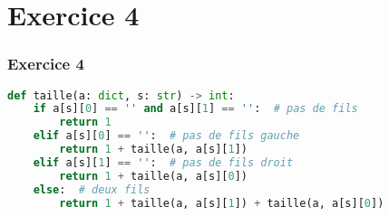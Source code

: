 \documentclass[svgnames,11pt]{beamer}
\begin{document}
\section{Exercice 4}
\begin{frame}[fragile]
    \frametitle{Exercice 4}

\begin{center}
\begin{lstlisting}[language=Python , basicstyle=\ttfamily\small, xleftmargin=.3em, xrightmargin=-3em]
def taille(a: dict, s: str) -> int:
    if a[s][0] == '' and a[s][1] == '':  # pas de fils
        return 1
    elif a[s][0] == '':  # pas de fils gauche
        return 1 + taille(a, a[s][1])
    elif a[s][1] == '':  # pas de fils droit
        return 1 + taille(a, a[s][0])
    else:  # deux fils
        return 1 + taille(a, a[s][1]) + taille(a, a[s][0])
\end{lstlisting}
\end{center}    

\end{frame}
\end{document}
